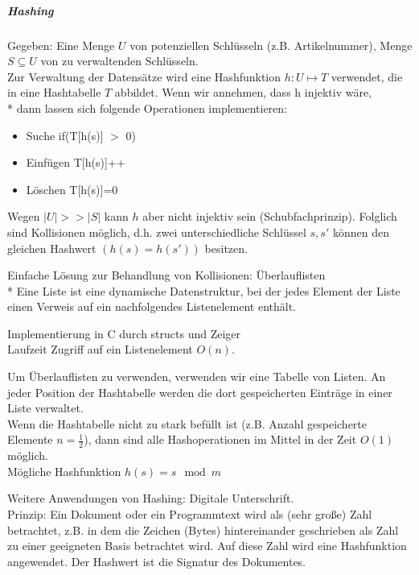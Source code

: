 \documentclass[a4paper]{scrartcl}
\begin{document}
\subparagraph{Hashing} Gegeben: Eine Menge $U$ von potenziellen Schlüsseln (z.B. Artikelnummer), Menge $S\subseteq U$ von zu verwaltenden Schlüsseln.\\
Zur Verwaltung der Datensätze wird eine Hashfunktion $h: U \mapsto T$ verwendet, die in eine Hashtabelle $T$ abbildet.
Wenn wir annehmen, dass h injektiv wäre,\\*
dann lassen sich folgende Operationen implementieren:
\begin{itemize}
\item Suche if(T[h(s)] $>$ 0)
\item Einfügen T[h(s)]++
\item Löschen T[h(s)]=0
\end{itemize}
Wegen $\lvert U \rvert >> \lvert S \rvert$ kann $h$ aber nicht injektiv sein (Schubfachprinzip). Folglich sind Kollisionen möglich, d.h. zwei unterschiedliche Schlüssel $s,s'$ können den gleichen Hashwert $(h(s)=h(s'))$ besitzen.

Einfache Lösung zur Behandlung von Kollisionen: Überlauflisten\\*
Eine Liste ist eine dynamische Datenstruktur, bei der jedes Element der Liste einen Verweis auf ein nachfolgendes Listenelement enthält.


Implementierung in C durch structs und Zeiger\\
Laufzeit Zugriff auf ein Listenelement $O(n)$.

Um Überlauflisten zu verwenden, verwenden wir eine Tabelle von Listen. An jeder Position der Hashtabelle werden die dort gespeicherten Einträge in einer Liste verwaltet.\\
Wenn die Hashtabelle nicht zu stark befüllt ist (z.B. Anzahl gespeicherte Elemente $n=\frac{1}{2}$), dann sind alle Hashoperationen im Mittel in der Zeit $O(1)$ möglich.\\
Mögliche Hashfunktion $h(s)=s \mod{m}$

Weitere Anwendungen von Hashing: Digitale Unterschrift.\\
Prinzip: Ein Dokument oder ein Programmtext wird als (sehr große) Zahl betrachtet, z.B. in dem die Zeichen (Bytes) hintereinander geschrieben als Zahl zu einer geeigneten Basis betrachtet wird. Auf diese Zahl wird eine Hashfunktion angewendet. Der Hashwert ist die Signatur des Dokumentes.
\end{document}

